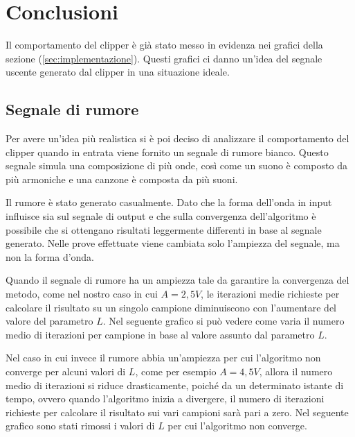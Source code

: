 \chapter{Conclusioni}
	Il comportamento del clipper è già stato messo in evidenza nei grafici della sezione (\ref{sec:implementazione}). Questi grafici ci danno un'idea del segnale uscente generato dal clipper in una situazione ideale.
	
	\section{Segnale di rumore}
		Per avere un'idea più realistica si è poi deciso di analizzare il comportamento del clipper quando in entrata viene fornito un segnale di rumore bianco. Questo segnale simula una composizione di più onde, così come un suono è composto da più armoniche e una canzone è composta da più suoni.
	
		Il rumore è stato generato casualmente. Dato che la forma dell'onda in input influisce sia sul segnale di output e che sulla convergenza dell'algoritmo è possibile che si ottengano risultati leggermente differenti in base al segnale generato. Nelle prove effettuate viene cambiata solo l'ampiezza del segnale, ma non la forma d'onda. %
	
		\graficospace
	
		Quando il segnale di rumore ha un ampiezza tale da garantire la convergenza del metodo, come nel nostro caso in cui $A = 2,5V$, le iterazioni medie richieste per calcolare il risultato su un singolo campione diminuiscono con l'aumentare del valore del parametro $L$. Nel seguente grafico si può vedere come varia il numero medio di iterazioni per campione in base al valore assunto dal parametro $L$.
	
		\graficospace
		\pagebreak
	
		Nel caso in cui invece il rumore abbia un'ampiezza per cui l'algoritmo non converge per alcuni valori di $L$, come per esempio $A = 4,5V$, allora il numero medio di iterazioni si riduce drasticamente, poiché da un determinato istante di tempo, ovvero quando l'algoritmo inizia a divergere, il numero di iterazioni richieste per calcolare il risultato sui vari campioni sarà pari a zero. Nel seguente grafico sono stati rimossi i valori di $L$ per cui l'algoritmo non converge.
	
